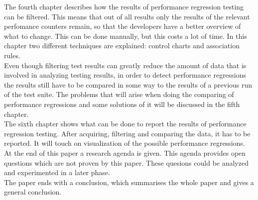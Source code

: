 The fourth chapter describes how the results of performance regression testing can be filtered. This means that out of all results only the results of the relevant perfomance counters remain, so that the developers have a better overview of what to change. This can be done manually, but this costs a lot of time. In this chapter two different techniques are explained: control charts and association rules. \\

Even though filtering test results can greatly reduce the amount of data that is involved in analyzing testing results, in order to detect performance regressions the results still have to be compared in some way to the results of a previous run of the test suite. The problems that will arise when doing the comparing of performance regressions and some solutions of it will be discussed in the fifth chapter. \\

The sixth chapter shows what can be done to report the results of performance regression testing. After acquiring, filtering and comparing the data, it has to be reported. It will touch on visualization of the possible performance regressions. \\

At the end of this paper a research agenda is given. This agenda provides open questions which are not proven by this paper. These quesions could be analyzed and experimented in a later phase. \\
The paper ends with a conclusion, which summarises the whole paper and gives a general conclusion. 